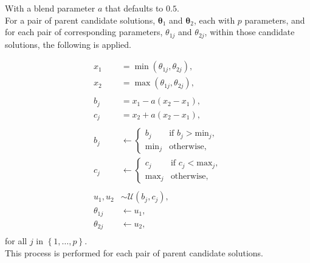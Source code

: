 \documentclass[
  a4paper,
]{article}
\newcommand{\B}[1]{\boldsymbol{#1}}
\newcommand{\+}{\phantom{-}}
\newcommand{\op}[2]{\operatorname{#1}\left(#2\right)}
\begin{document}
\begin{tcolorbox}[title=Blend crossover: \texttt{gareal\_blxCrossover()}]
With a blend parameter $a$ that defaults to $0.5$.
\\

For a pair of parent candidate solutions, $\B\theta_1$ and $\B\theta_2$, each with $p$ parameters, and for each pair of corresponding parameters, $\theta_{1j}$ and $\theta_{2j}$, within those candidate solutions, the following is applied.

$$
\begin{aligned}
x_1 &= \op\min{\theta_{1j}, \theta_{2j}}, \\
x_2 &= \op\max{\theta_{1j}, \theta_{2j}}, \\
\\
b_j &= x_1 - a\left(x_2-x_1\right), \\
c_j &= x_2 + a\left(x_2-x_1\right), \\
\\
b_j &\leftarrow 
\begin{cases}
b_j &\text{if } b_j>\text{min}_j,\\
\text{min}_j &\text{otherwise},
\end{cases}\\
c_j &\leftarrow 
\begin{cases}
c_j &\text{if } c_j<\text{max}_j,\\
\text{max}_j &\text{otherwise},
\end{cases} \\
\\
u_1,u_2 &\sim \mathcal U \!\left(b_j,c_j\right),\\
\theta_{1j} &\leftarrow u_1,\\
\theta_{2j} &\leftarrow u_2,\\
\end{aligned}
$$
for all $j$ in $\left\{1, \dots, p\right\}$.\\

This process is performed for each pair of parent candidate solutions.
\end{tcolorbox}
\end{document}
